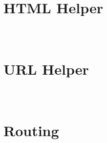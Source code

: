 \begin{lstlisting}[language=PHP]

\end{lstlisting}




\begin{lstlisting}[language=PHP]

\end{lstlisting}


\chapter{HTML Helper}

\begin{lstlisting}[language=PHP]

\end{lstlisting}




\begin{lstlisting}[language=PHP]

\end{lstlisting}



\begin{lstlisting}[language=PHP]

\end{lstlisting}

\chapter{URL Helper}


\begin{lstlisting}[language=PHP]

\end{lstlisting}



\begin{lstlisting}[language=PHP]

\end{lstlisting}



\begin{lstlisting}[language=PHP]

\end{lstlisting}

\chapter{Routing}

\begin{lstlisting}[language=PHP]

\end{lstlisting}




